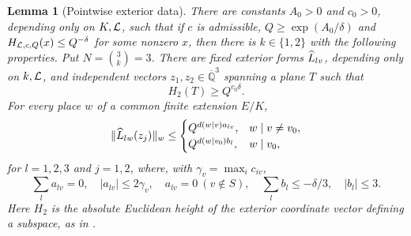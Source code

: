 \documentclass[11pt]{article}
\numberwithin{equation}{section}
\newtheorem{lemma}[theorem]{Lemma}
\theoremstyle{remark}\newtheorem{remark}[theorem]{Remark}
\newcommand{\Qbar}{\overline{\mathbb Q}}
\begin{document}
\begin{lemma}[Pointwise exterior data]\label{lem:packet}
There are constants $A_0>0$ and $c_0>0$, depending only on $K,\mathcal L$, such
that if $c$ is admissible, $Q\ge\exp(A_0/\delta)$ and
$H_{\mathcal L,c,Q}(x)\le Q^{-\delta}$ for some nonzero $x$, then there is
$k\in\{1,2\}$ with the following properties. Put $N=\binom3k=3$.
There are fixed exterior forms $\widehat L_{lv}$, depending only on $k,\mathcal L$,
and independent vectors $z_1,z_2\in\Qbar^3$ spanning a plane $T$ such that
\begin{equation}\label{eq:packetheight}
 H_2(T)\ge Q^{c_0\delta}.
\end{equation}
For every place $w$ of a common finite extension $E/K$,
\begin{equation}\label{eq:packetlocal}
 \|\widehat L_{lw}(z_j)\|_w\le
 \begin{cases}Q^{d(w\mid v)a_{lv}},&w\mid v\ne v_0,\\
 Q^{d(w\mid v_0)b_l},&w\mid v_0,
 \end{cases}
\end{equation}
for $l=1,2,3$ and $j=1,2$, where, with $\gamma_v=\max_i c_{iv}$,
\begin{equation}\label{eq:packetweights}
 \sum_l a_{lv}=0,\quad |a_{lv}|\le2\gamma_v,\quad
 a_{lv}=0\ (v\notin S),\quad
 \sum_l b_l\le-\delta/3,\quad |b_l|\le3.
\end{equation}
Here $H_2$ is the absolute Euclidean height of the exterior coordinate
vector defining a subspace, as in \cite[Section~6]{EF13}.
\end{lemma}
\end{document}
